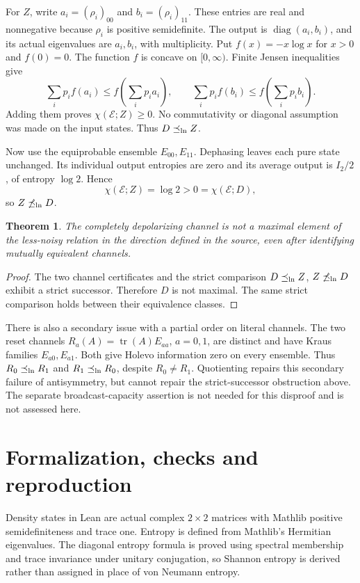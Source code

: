 \documentclass[11pt]{article}
\newtheorem{theorem}{Theorem}
\newcommand{\tr}{\operatorname{tr}}
\begin{document}
For $Z$, write $a_i=(\rho_i)_{00}$ and $b_i=(\rho_i)_{11}$.
These entries are real and nonnegative because $\rho_i$
is positive semidefinite. The output is
$\operatorname{diag}(a_i,b_i)$, and its actual eigenvalues
are $a_i,b_i$, with multiplicity. Put $f(x)=-x\log x$ for
$x>0$ and $f(0)=0$. The function $f$ is concave on
$[0,\infty)$. Finite Jensen inequalities give
\[
 \sum_i p_i f(a_i)\leq f\left(\sum_i p_i a_i\right),
 \qquad
 \sum_i p_i f(b_i)\leq f\left(\sum_i p_i b_i\right).
\]
Adding them proves $\chi(\mathcal E;Z)\geq0$. No
commutativity or diagonal assumption was made on the input
states. Thus $D\preceq_{\rm ln}Z$.

Now use the equiprobable ensemble $E_{00},E_{11}$.
Dephasing leaves each pure state unchanged. Its individual
output entropies are zero and its average output is $I_2/2$,
of entropy $\log2$. Hence
\[
 \chi(\mathcal E;Z)=\log2>0=\chi(\mathcal E;D),
\]
so $Z\not\preceq_{\rm ln}D$.

\begin{theorem}
The completely depolarizing channel is not a maximal element
of the less-noisy relation in the direction defined in the
source, even after identifying mutually equivalent channels.
\end{theorem}
\begin{proof}
The two channel certificates and the strict comparison
$D\preceq_{\rm ln}Z$, $Z\not\preceq_{\rm ln}D$ exhibit a
strict successor. Therefore $D$ is not maximal. The same
strict comparison holds between their equivalence classes.
\end{proof}

There is also a secondary issue with a partial order on
literal channels. The two reset channels
$R_a(A)=\tr(A)E_{aa}$, $a=0,1$, are distinct and have
Kraus families $E_{a0},E_{a1}$. Both give Holevo information
zero on every ensemble. Thus $R_0\preceq_{\rm ln}R_1$ and
$R_1\preceq_{\rm ln}R_0$, despite $R_0\ne R_1$.
Quotienting repairs this secondary failure of antisymmetry,
but cannot repair the strict-successor obstruction above.
The separate broadcast-capacity assertion is not needed
for this disproof and is not assessed here.

\newpage
\section*{Formalization, checks and reproduction}
Density states in Lean are actual complex $2\times2$
matrices with Mathlib positive semidefiniteness and trace
one. Entropy is defined from Mathlib's Hermitian eigenvalues.
The diagonal entropy formula is proved using spectral
membership and trace invariance under unitary conjugation,
so Shannon entropy is derived rather than assigned in place
of von Neumann entropy.
\end{document}
